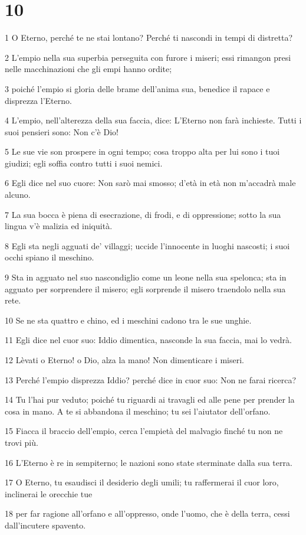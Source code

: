 \chapter{10}

\par 1 O Eterno, perché te ne stai lontano? Perché ti nascondi in tempi di distretta?
\par 2 L'empio nella sua superbia perseguita con furore i miseri; essi rimangon presi nelle macchinazioni che gli empi hanno ordite;
\par 3 poiché l'empio si gloria delle brame dell'anima sua, benedice il rapace e disprezza l'Eterno.
\par 4 L'empio, nell'alterezza della sua faccia, dice: L'Eterno non farà inchieste. Tutti i suoi pensieri sono: Non c'è Dio!
\par 5 Le sue vie son prospere in ogni tempo; cosa troppo alta per lui sono i tuoi giudizi; egli soffia contro tutti i suoi nemici.
\par 6 Egli dice nel suo cuore: Non sarò mai smosso; d'età in età non m'accadrà male alcuno.
\par 7 La sua bocca è piena di esecrazione, di frodi, e di oppressione; sotto la sua lingua v'è malizia ed iniquità.
\par 8 Egli sta negli agguati de' villaggi; uccide l'innocente in luoghi nascosti; i suoi occhi spiano il meschino.
\par 9 Sta in agguato nel suo nascondiglio come un leone nella sua spelonca; sta in agguato per sorprendere il misero; egli sorprende il misero traendolo nella sua rete.
\par 10 Se ne sta quattro e chino, ed i meschini cadono tra le sue unghie.
\par 11 Egli dice nel cuor suo: Iddio dimentica, nasconde la sua faccia, mai lo vedrà.
\par 12 Lèvati o Eterno! o Dio, alza la mano! Non dimenticare i miseri.
\par 13 Perché l'empio disprezza Iddio? perché dice in cuor suo: Non ne farai ricerca?
\par 14 Tu l'hai pur veduto; poiché tu riguardi ai travagli ed alle pene per prender la cosa in mano. A te si abbandona il meschino; tu sei l'aiutator dell'orfano.
\par 15 Fiacca il braccio dell'empio, cerca l'empietà del malvagio finché tu non ne trovi più.
\par 16 L'Eterno è re in sempiterno; le nazioni sono state sterminate dalla sua terra.
\par 17 O Eterno, tu esaudisci il desiderio degli umili; tu raffermerai il cuor loro, inclinerai le orecchie tue
\par 18 per far ragione all'orfano e all'oppresso, onde l'uomo, che è della terra, cessi dall'incutere spavento.

